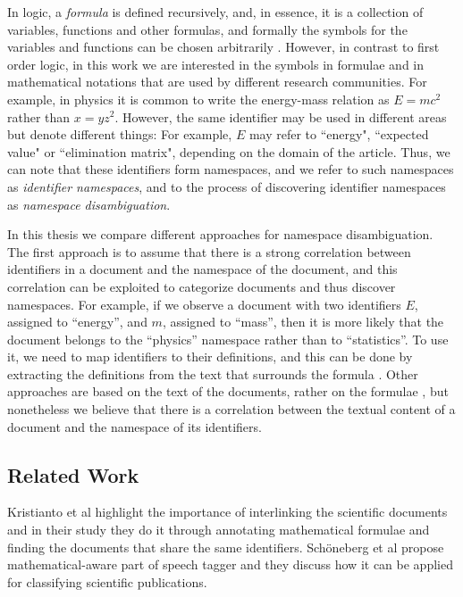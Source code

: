 \documentclass[12pt,a4paper]{article}
\begin{document}
In logic, a \emph{formula} is defined recursively, and, in essence, it is a collection of variables, functions and other formulas, and formally the symbols for the variables and functions can be chosen arbitrarily \cite{source:barwise02-logic}. However, in contrast to first order logic, in this work we are interested in the symbols in formulae and in mathematical notations that are used by different research communities.
For example, in physics it is common to write the energy-mass relation as $E=mc^2$ rather than $x=yz^2$.
However, the same identifier may be used in different areas but denote different things: For example, $E$ may refer to ``energy", ``expected value" or ``elimination matrix", depending on the domain of the article. Thus, we can note that these identifiers form namespaces, and we refer to such namespaces as \emph{identifier namespaces}, and to the process of discovering identifier namespaces as \emph{namespace disambiguation}.



In this thesis we compare different approaches for namespace disambiguation. The first approach is to assume that there is a strong correlation between identifiers in a document and the namespace of the document, and this correlation can be exploited to categorize documents and thus discover namespaces. For example, if we observe a document with two identifiers $E$, assigned to ``energy'', and $m$, assigned to ``mass'', then it is more likely that the document belongs to the ``physics'' namespace rather than to ``statistics''. To use it, we need to map identifiers to their definitions, and this can be done by extracting the definitions from the text that surrounds the formula \cite{source:mlpp}. Other approaches are based on the text of the documents, rather on the formulae \cite{source:sebastiani02}, but nonetheless we believe that there is a correlation between the textual content of a document and the namespace of its identifiers.


\subsection{Related Work}

Kristianto et al \cite{source:kristianto14} highlight the importance of interlinking the scientific documents and in their study they do it through annotating mathematical formulae and finding the documents that share the same identifiers. Sch\"oneberg et al \cite{source:schoneberg14} propose mathematical-aware part of speech tagger and they discuss how it can be applied for classifying scientific publications.
\end{document}
